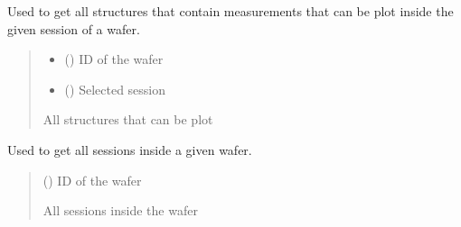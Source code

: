 \documentclass[letterpaper,10pt,english]{sphinxmanual}
\begin{document}

\begin{fulllineitems}
\label{\detokenize{getter:getter.get_plot_structures}}
\pysigstartsignatures
{}
\pysigstopsignatures
\sphinxAtStartPar
Used to get all structures that contain measurements that can be plot inside the given session of a wafer.
\begin{quote}\begin{description}
\begin{itemize}
\item {} 
\sphinxAtStartPar
{} () \textendash{} ID of the wafer

\item {} 
\sphinxAtStartPar
{} () \textendash{} Selected session

\end{itemize}

\sphinxAtStartPar
All structures that can be plot

\end{description}\end{quote}

\end{fulllineitems}


\begin{fulllineitems}
\label{\detokenize{getter:getter.get_sessions}}
\pysigstartsignatures
{}
\pysigstopsignatures
\sphinxAtStartPar
Used to get all sessions inside a given wafer.
\begin{quote}\begin{description}
\sphinxAtStartPar
{} () \textendash{} ID of the wafer

\sphinxAtStartPar
All sessions inside the wafer

\end{description}\end{quote}

\end{fulllineitems}
\end{document}
